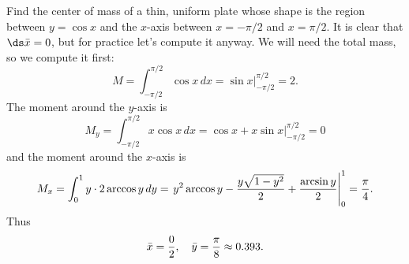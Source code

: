 \begin{example} \relax\label{exam:center of mass under cos}
Find the center of mass of a thin, uniform plate whose shape
is the region between $y=\cos x$ and the $x$-axis between $x=-\pi/2$
and $x=\pi/2$. It is clear that $\ds \bar x=0$, but for practice let's
compute it anyway. We will need the total mass, so we compute it
first:
$$
  M=\int_{-\pi/2}^{\pi/2} \cos x\,dx=\sin x\Big|_{-\pi/2}^{\pi/2}=2.
$$
The moment around the $y$-axis is
$$
  M_y=\int_{-\pi/2}^{\pi/2} x\cos x\,dx=
  \cos x+x\sin x\Big|_{-\pi/2}^{\pi/2}=0
$$
and the moment around the $x$-axis is
$$
  M_x=\int_{0}^{1} y\cdot2\arccos y\,dy=
  \left.y^2\arccos y-{y\sqrt{1-y^2}\over2}+{\arcsin y\over 2}
  \right|_{0}^{1}={\pi\over4}.
$$
Thus
$$\bar x={0\over2},\quad \bar y={\pi\over8}\approx 0.393.$$
\vskip-10pt\end{example}

